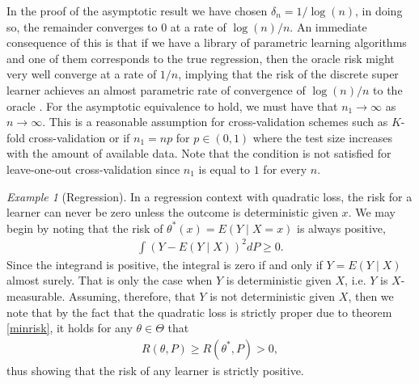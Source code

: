 \documentclass[11pt, a4paper]{article}
\theoremstyle{definition}
\theoremstyle{remark}
\newtheorem{example}{Example}
\newcommand{\q}{q}
\newcommand{\btheta}{\theta}
\begin{document}
In the proof of the asymptotic result we have chosen $ \delta_n = 1/\log(n) $, in doing so, the remainder converges to $ 0 $ at a rate of $ \log(n)/n $. An immediate consequence of this is that if we have a library of parametric learning algorithms and one of them corresponds to the true regression, then the oracle risk might very well converge at a rate of $ 1/n $, implying that the risk of the discrete super learner achieves an almost parametric rate of convergence of $ \log(n)/n $ to the oracle \parencite{van2007super}.  
For the asymptotic equivalence to hold, we must have that $ n_1 \to \infty $ as $ n \to \infty $. This is a reasonable assumption for cross-validation schemes such as $ K $-fold cross-validation or if $ n_1 = np $ for $ p \in (0,1) $ where the test size increases with the amount of available data. Note that the condition is not satisfied for leave-one-out cross-validation since $ n_1$ is equal to $ 1 $ for every $ n $.  

\begin{example}[Regression]
   In a regression context with quadratic loss, the risk for a learner can never be zero unless the outcome is deterministic given $ x $. We may begin by noting that the risk of $ \theta^*(x) = E(Y \mid X = x) $ is always positive,
   \begin{align*}
       \int (Y - E(Y \mid X))^2 d P \geq 0. 
   \end{align*}
   Since the integrand is positive, the integral is zero if and only if $ Y = E(Y \mid X) $ almost surely. That is only the case when $ Y $ is deterministic given $ X $, i.e. $ Y $ is $ X $-measurable. Assuming, therefore, that $ Y $ is not deterministic given $ X $, then we note that by the fact that the quadratic loss is strictly proper due to theorem \ref{minrisk}, it holds for any $ \theta \in \Theta $ that
   \begin{align*}
       R(\theta, P) \geq R(\theta^*, P) > 0,
   \end{align*}
    thus showing that the risk of any learner is strictly positive.
\end{example}



\end{document}
